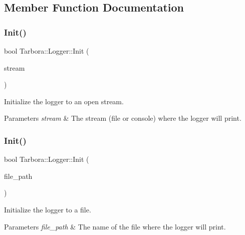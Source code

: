 \subsection{Member Function Documentation}
\mbox{\label{classTarbora_1_1Logger_abb526de5b2ecd2bda6ec4883de07bec8}} 
\subsubsection{\texorpdfstring{Init()}{Init()}\hspace{0.1cm}{\footnotesize\ttfamily [1/2]}}
{\footnotesize\ttfamily bool Tarbora\+::\+Logger\+::\+Init (\begin{DoxyParamCaption}\item[{F\+I\+LE $\ast$}]{stream }\end{DoxyParamCaption})\hspace{0.3cm}{\ttfamily [static]}}



Initialize the logger to an open stream. 


\begin{DoxyParams}{Parameters}
{\em stream} & The stream (file or console) where the logger will print. \\
\hline
\end{DoxyParams}
\mbox{\label{classTarbora_1_1Logger_a625b88289ed91c3059320a9573e16103}} 
\subsubsection{\texorpdfstring{Init()}{Init()}\hspace{0.1cm}{\footnotesize\ttfamily [2/2]}}
{\footnotesize\ttfamily bool Tarbora\+::\+Logger\+::\+Init (\begin{DoxyParamCaption}\item[{std\+::string}]{file\+\_\+path }\end{DoxyParamCaption})\hspace{0.3cm}{\ttfamily [static]}}



Initialize the logger to a file. 


\begin{DoxyParams}{Parameters}
{\em file\+\_\+path} & The name of the file where the logger will print. \\
\hline
\end{DoxyParams}
\mbox{\label{classTarbora_1_1Logger_aa32641fca455178d88f3b1c8b2f552ab}} 
